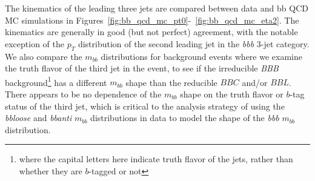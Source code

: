 The kinematics of the leading three jets are compared between data and bb QCD MC simulations in 
Figures~\ref{fig:bb_qcd_mc_pt0}-~\ref{fig:bb_qcd_mc_eta2}.  The kinematics are
generally in good (but not perfect) agreement, with the notable exception of the
$p_T$ distribution of the second leading jet in the \textit{bbb} 3-jet category.
We also compare the $m_{bb}$ distributions for background events where we 
examine the truth flavor of the third jet in the event, to see if the irreducible
\textit{BBB} background\footnote{where the capital letters here indicate truth flavor
of the jets, rather than whether they are $b$-tagged or not} has a different
$m_{bb}$ shape than the reducible $BBC$ and/or $BBL$.  There appears to be
no dependence of the $m_{bb}$ shape on the truth flavor or $b$-tag status of the third jet, which
is critical to the analysis strategy of using the
\textit{bbloose} and \textit{bbanti} $m_{bb}$ distributions in data to 
model the shape of the \textit{bbb} $m_{bb}$ distribution.


